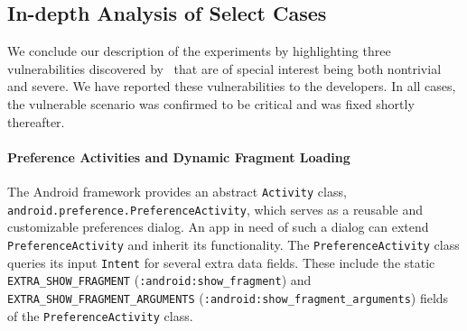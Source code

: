 %
%
%

\subsection{In-depth Analysis of Select Cases}\label{Se:caseStudies}

We conclude our description of the experiments by highlighting three vulnerabilities discovered by \Tool\ that are of special interest being both nontrivial and severe. We have reported these vulnerabilities to the developers. In all cases, the vulnerable scenario was confirmed to be critical and was fixed shortly thereafter.

\paragraph{Preference Activities and Dynamic Fragment Loading}\label{Se:PreferenceActivities}

The Android framework provides an abstract {\tt Activity} class,\texttt{
android.preference.PreferenceActivity}, which serves as a reusable and customizable preferences dialog. An app in need of such a dialog can extend {\tt PreferenceActivity} and inherit its functionality.
The {\tt PreferenceActivity} class queries its input {\tt Intent} for several extra data fields. These include the static  \texttt{EXTRA\_SHOW\_FRAGMENT}
(\texttt{:android:show\_fragment}) and \texttt{EXTRA\_SHOW\_FRAGMENT\_ARGUMENTS}
(\texttt{:android:show\_fragment\_arguments}) fields
of the {\tt PreferenceActivity} class. 

